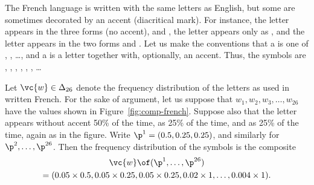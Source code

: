 \begin{example}
% 
The French language is written with the same letters as English, but some
are sometimes decorated by an accent (diacritical mark).  For instance, the
letter  appears in the three forms  (no accent),  and
, the letter  appears only as , and the letter 
appears in the two forms  and .  Let us make the
conventions that a  is one of , ,
\ldots,  and a  is a letter together
with, optionally, an accent.  Thus, the symbols are , ,
, , , , \ldots

Let $\vc{w} \in \Delta_{26}$ denote the frequency distribution of the
letters as used in written French.  For the sake of argument, let us
suppose that $w_1, w_2, w_3, \ldots, w_{26}$ have the values shown in
Figure~\ref{fig:comp-french}.  Suppose also that the letter  appears
without accent 50\% of the time, as  25\% of the time, and as
 25\% of the time, again as in the figure.  Write $\p^1 = (0.5,
0.25, 0.25)$, and similarly for $\p^2, \ldots, \p^{26}$.  Then the
frequency distribution of the symbols is the composite
% 
\begin{multline*}
\vc{w} \of (\p^1, \ldots, \p^{26})\\
=
(0.05 \times 0.5, 0.05 \times 0.25, 0.05 \times 0.25, 0.02 \times 1, 
\ldots, 0.004 \times 1).
\end{multline*}


\end{example}
